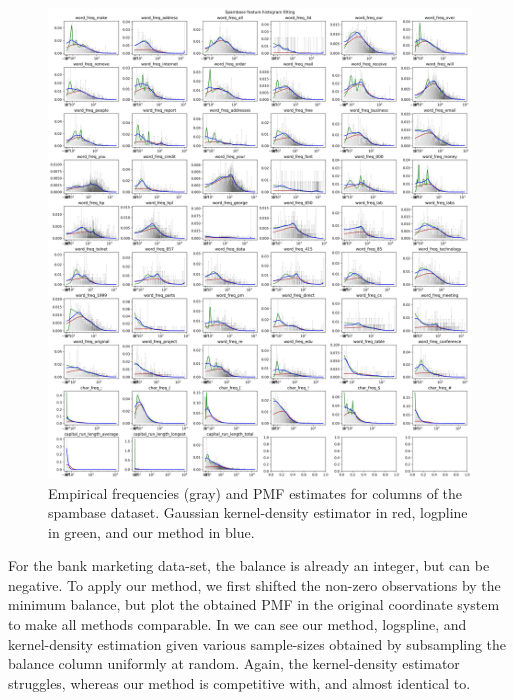\documentclass[10pt]{article} %
\begin{document}
\begin{figure}
    \centering
    \includegraphics[width=\textwidth]{spambase.png}
    \caption{Empirical frequencies (gray) and PMF estimates for columns of the spambase dataset. Gaussian kernel-density estimator in red, logpline in green, and our method in blue.}
    \label{fig:spambase}
\end{figure}

For the bank marketing data-set, the balance is already an integer, but can be negative. To apply our method, we first shifted the non-zero observations by the minimum balance, but plot the obtained PMF in the original coordinate system to make all methods comparable. In  we can see our method, logspline, and kernel-density estimation given various sample-sizes obtained by subsampling the balance column uniformly at random. Again, the kernel-density estimator struggles, whereas our method is competitive with, and almost identical to.
\end{document}
